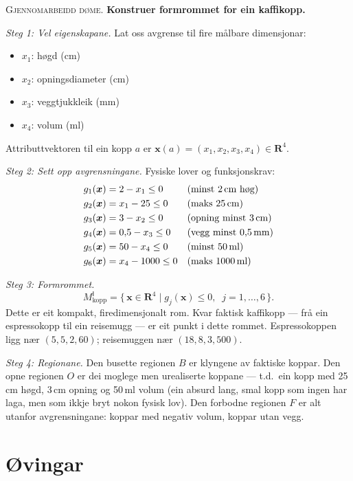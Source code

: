 \documentclass[10pt]{book}
\theoremstyle{definition}
\theoremstyle{plain}
\theoremstyle{remark}
\newenvironment{gjennomgang}%
  {\medskip\noindent\textsc{Gjennomarbeidd d\o me.}\enspace}%
  {\medskip}
\providecommand{\R}{}
\renewcommand{\R}{\mathbf{R}}
\begin{document}
\begin{gjennomgang}
\textbf{Konstruer formrommet for ein kaffikopp.}

\textit{Steg 1: Vel eigenskapane.} Lat oss avgrense til fire m\aa lbare dimensjonar:
\begin{itemize}[nosep]
  \item $x_1$: h\o gd (cm)
  \item $x_2$: opningsdiameter (cm)
  \item $x_3$: veggtjukkleik (mm)
  \item $x_4$: volum (ml)
\end{itemize}
Attributtvektoren til ein kopp $a$ er $\bm{x}(a) = (x_1, x_2, x_3, x_4) \in \R^4$.

\textit{Steg 2: Sett opp avgrensningane.} Fysiske lover og funksjonskrav:
\begin{align*}
  g_1(\bm{x}) &= 2 - x_1 \leq 0 && \text{(minst 2\,cm h\o g)} \\
  g_2(\bm{x}) &= x_1 - 25 \leq 0 && \text{(maks 25\,cm)} \\
  g_3(\bm{x}) &= 3 - x_2 \leq 0 && \text{(opning minst 3\,cm)} \\
  g_4(\bm{x}) &= 0{,}5 - x_3 \leq 0 && \text{(vegg minst 0{,}5\,mm)} \\
  g_5(\bm{x}) &= 50 - x_4 \leq 0 && \text{(minst 50\,ml)} \\
  g_6(\bm{x}) &= x_4 - 1000 \leq 0 && \text{(maks 1000\,ml)}
\end{align*}

\textit{Steg 3: Formrommet.}
\[
  M^{\mathsf{I}}_{\text{kopp}} = \bigl\{\, \bm{x} \in \R^4
    \;\big|\; g_j(\bm{x}) \leq 0,\;\; j = 1, \ldots, 6 \,\bigr\}.
\]
Dette er eit kompakt, firedimensjonalt rom. Kvar faktisk kaffikopp --- fr\aa{} ein espressokopp til ein reisemugg --- er eit punkt i dette rommet. Espressokoppen ligg n\ae r $(5, 5, 2, 60)$; reisemuggen n\ae r $(18, 8, 3, 500)$.

\textit{Steg 4: Regionane.} Den busette regionen $B$ er klyngene av faktiske koppar. Den opne regionen $O$ er dei moglege men urealiserte koppane --- t.d.\ ein kopp med 25\,cm h\o gd, 3\,cm opning og 50\,ml volum (ein absurd lang, smal kopp som ingen har laga, men som ikkje bryt nokon fysisk lov). Den forbodne regionen $F$ er alt utanfor avgrensningane: koppar med negativ volum, koppar utan vegg.
\end{gjennomgang}

\section{\O vingar}
\end{document}
